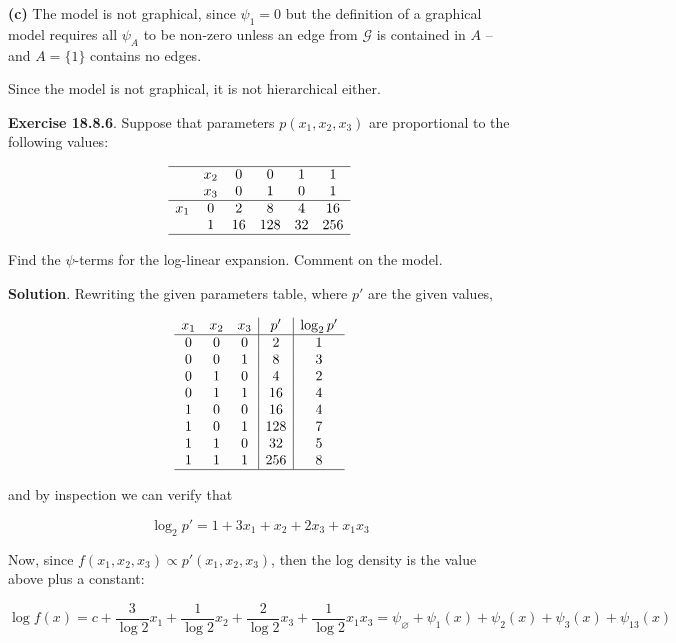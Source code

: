 \textbf{(c)} The model is not graphical, since \(\psi_1 = 0\) but the
definition of a graphical model requires all \(\psi_A\) to be non-zero
unless an edge from \(\mathcal{G}\) is contained in \(A\) -- and
\(A = \{ 1 \}\) contains no edges.

Since the model is not graphical, it is not hierarchical either.

\textbf{Exercise 18.8.6}. Suppose that parameters \(p(x_1, x_2, x_3)\)
are proportional to the following values:

\[
\begin{array}{cccccc}
\hline
    & x_2 & 0  & 0   & 1  & 1 \\
    & x_3 & 0  & 1   & 0  & 1 \\
\hline
x_1 & 0   & 2  &   8 &  4 & 16 \\
    & 1   & 16 & 128 & 32 & 256 \\
\hline
\end{array}
\]

Find the \(\psi\)-terms for the log-linear expansion. Comment on the
model.

\textbf{Solution}. Rewriting the given parameters table, where \(p'\)
are the given values,

\[
\begin{array}{ccc | c | c}
x_1 & x_2 & x_3 & p'   & \log_2 p'\\
\hline
0   &   0  &  0 & 2   & 1\\
0   &   0  &  1 & 8   & 3\\
0   &   1  &  0 & 4   & 2\\
0   &   1  &  1 & 16  & 4\\
1   &   0  &  0 & 16  & 4\\
1   &   0  &  1 & 128 & 7\\
1   &   1  &  0 & 32  & 5\\
1   &   1  &  1 & 256 & 8\\
\hline
\end{array}
\]

and by inspection we can verify that

\[ \log_2 p' = 1 + 3 x_1 + x_2 + 2 x_3 + x_1 x_3 \]

Now, since \(f(x_1, x_2, x_3) \propto p'(x_1, x_2, x_3)\), then the log
density is the value above plus a constant:

\[ \log f(x) = c + \frac{3}{\log 2} x_1 + \frac{1}{\log 2} x_2 + \frac{2}{\log 2} x_3 + \frac{1}{\log 2} x_1 x_3  = \psi_\varnothing + \psi_1(x) + \psi_2(x) + \psi_3(x) + \psi_{13}(x)\]

